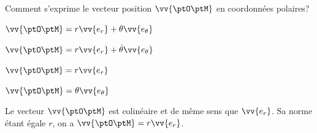 \finEntrainement






\hauteurLargeurCadreReponse		{8mm}{2cm}
\initialisationEntrainement


\debutEntrainement


\begin{enonce}
	Comment s'exprime le vecteur position $\vv{\ptO \ptM}$ en coordonnées polaires? 
	
	\begin{listeQCM4Colonnes}
	\item $\vv{\ptO \ptM} = r\vv{e_r} + \theta \vv{e_\theta}$
	\item $\vv{\ptO \ptM} = r\vv{e_r} + \dot{\theta} \vv{e_\theta}$
	\item $\vv{\ptO \ptM} = r\vv{e_r}$
	\item $\vv{\ptO \ptM} = \theta \vv{e_\theta}$
	\end{listeQCM4Colonnes}
	
	\bigskip
	
\end{enonce}

\reponse{\reponseC{}}

\begin{corrige}
	Le vecteur $\vv{\ptO\ptM}$ est colinéaire et de même sens que $\vv{e_r}$. Sa norme étant égale $r$, on a $\vv{\ptO \ptM} = r\vv{e_r}$.
\end{corrige}

